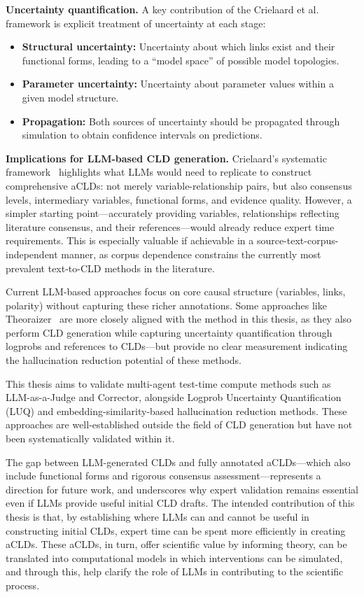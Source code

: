 \medskip
\noindent
\textbf{Uncertainty quantification.} A key contribution of the Crielaard et al. framework is explicit treatment of uncertainty at each stage:
\begin{itemize}
    \item \textbf{Structural uncertainty:} Uncertainty about which links exist and their functional forms, leading to a ``model space'' of possible model topologies.
    \item \textbf{Parameter uncertainty:} Uncertainty about parameter values within a given model structure.
    \item \textbf{Propagation:} Both sources of uncertainty should be propagated through simulation to obtain confidence intervals on predictions.
\end{itemize}

\medskip
\noindent
\textbf{Implications for LLM-based CLD generation.} Crielaard's systematic framework~\citep{crielaard2024refining} highlights what LLMs would need to replicate to construct comprehensive aCLDs: not merely variable-relationship pairs, but also consensus levels, intermediary variables, functional forms, and evidence quality. However, a simpler starting point---accurately providing variables, relationships reflecting literature consensus, and their references---would already reduce expert time requirements. This is especially valuable if achievable in a source-text-corpus-independent manner, as corpus dependence constrains the currently most prevalent text-to-CLD methods in the literature.

Current LLM-based approaches focus on core causal structure (variables, links, polarity) without capturing these richer annotations. Some approaches like Theoraizer~\citep{Waaijers2024theoraizer} are more closely aligned with the method in this thesis, as they also perform CLD generation while capturing uncertainty quantification through logprobs and references to CLDs---but provide no clear measurement indicating the hallucination reduction potential of these methods.

This thesis aims to validate multi-agent test-time compute methods such as LLM-as-a-Judge and Corrector, alongside Logprob Uncertainty Quantification (LUQ) and embedding-similarity-based hallucination reduction methods. These approaches are well-established outside the field of CLD generation but have not been systematically validated within it.

The gap between LLM-generated CLDs and fully annotated aCLDs---which also include functional forms and rigorous consensus assessment---represents a direction for future work, and underscores why expert validation remains essential even if LLMs provide useful initial CLD drafts. The intended contribution of this thesis is that, by establishing where LLMs can and cannot be useful in constructing initial CLDs, expert time can be spent more efficiently in creating aCLDs. These aCLDs, in turn, offer scientific value by informing theory, can be translated into computational models in which interventions can be simulated, and through this, help clarify the role of LLMs in contributing to the scientific process.


